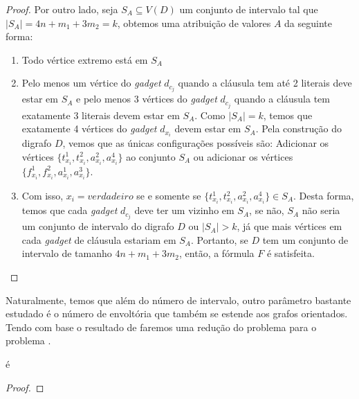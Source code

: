 \begin{theorem}
\begin{proof}
Por outro lado, seja $S_A \subseteq V(D)$ um conjunto de intervalo tal que $|S_A| = 4n+m_1+3m_2 = k$, obtemos uma atribuição de valores $A$ da seguinte forma:
\begin{enumerate}
    \item Todo vértice extremo está em $S_A$ 
    \item Pelo menos um vértice do \emph{gadget} $d_{c_j}$ quando a cláusula tem até 2 literais deve estar em $S_A$ e pelo menos 3 vértices do \emph{gadget} $d_{c_j}$ quando a cláusula tem exatamente 3 literais devem estar em $S_A$. Como $|S_A| = k$, temos que exatamente 4 vértices do \emph{gadget} $d_{x_i}$ devem estar em $S_A$. Pela construção do digrafo $D$, vemos que as únicas configurações possíveis são: Adicionar os vértices $\{t^1_{x_i},t^2_{x_i},a^2_{x_i},a^4_{x_i}\}$ ao conjunto $S_A$ ou adicionar os vértices $\{f^1_{x_i},f^2_{x_i},a^1_{x_i},a^3_{x_i}\}$.
    \item Com isso, $x_i = verdadeiro$ se e somente se $\{t^1_{x_i},t^2_{x_i},a^2_{x_i},a^4_{x_i}\} \in S_A$. Desta forma, temos que cada \emph{gadget} $d_{c_j}$ deve ter um vizinho em $S_A$, se não, $S_A$ não seria um conjunto de intervalo do digrafo $D$ ou $|S_A| > k$, já que mais vértices em cada \emph{gadget} de cláusula estariam em $S_A$. Portanto, se $D$ tem um conjunto de intervalo de tamanho $4n+m_1+3m_2$, então, a fórmula $F$ é satisfeita.
\end{enumerate}

\end{proof}
\end{theorem}

Naturalmente, temos que além do número de intervalo, outro parâmetro bastante estudado é o número de envoltória que também se estende aos grafos orientados. Tendo com base o resultado de \cite{PENSO201583} faremos uma redução do problema \sam para o problema \hnd.


\begin{theorem}
    \hnd é \npc
    \begin{proof}
        
    \end{proof}
\end{theorem}

